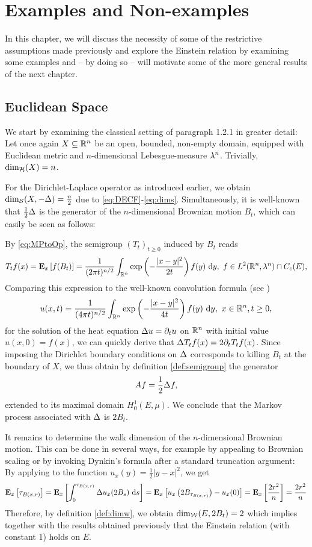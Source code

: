 \chapter{Examples and Non-examples}

In this chapter, we will discuss the necessity of some of the restrictive assumptions made previously and explore the Einstein relation by examining some examples and -- by doing so -- will motivate some of the more general results of the next chapter.

\section{Euclidean Space}

We start by examining the classical setting of paragraph 1.2.1 in greater detail: Let once again $X\ssq\IR^n$ be an open, bounded, non-empty domain, equipped with Euclidean metric and $n$-dimensional Lebesgue-measure $\gl^n$. Trivially, $\dimh(X)=n$. 

For the Dirichlet-Laplace operator as introduced earlier, we obtain 
$\dims(X,-\gD)=\frac{n}{2}$ due to \eqref{eq:DECF}-\eqref{eq:dims}. Simultaneously, it is well-known that $\frac{1}{2}\gD$ is the generator of the $n$-dimensional Brownian motion $B_t$, which can easily be seen as follows:

By \eqref{eq:MPtoOp}, the semigroup $(T_t)_{t\geq0}$ induced by $B_t$ reads
\[
  T_tf(x)
   =\PTEp{f(B_t)}{x}
   =\frac{1}{(2\pi t)^{n/2}}\int_{\IR^n} 
     \exp\left(-\frac{|x-y|^2}{2t}\right)f(y)\,\Di y,
  \ f\in L^2(\IR^n,\gl^n)\cap C_c(E),
\]
Comparing this expression to the well-known convolution formula (see \cite[p.47]{evans2010partial})
\[
  u(x,t)=\frac{1}{(4\pi t)^{n/2}}\int_{\IR^n} \exp\left(-\frac{|x-y|^2}{4t}\right)f(y)\,\Di y,\ x\in\IR^n, t\geq0,
\]
for the solution of the heat equation $\gD u=\partial_t u$ on $\IR^n$ with initial value $u(x,0)=f(x)$, we can quickly derive that $\gD T_tf(x)=2\partial_t T_tf(x)$. Since imposing the Dirichlet boundary conditions on $\gD$ corresponds to killing $B_t$ at the boundary of $X$, we thus obtain by definition \ref{def:semigroup} the generator
\[
  Af=\frac{1}{2}\gD f,
\]
extended to its maximal domain $H_0^1(E,\mu)$. We conclude that the Markov process associated with $\gD$ is $2B_t$.

It remains to determine the walk dimension of the $n$-dimensional Brownian motion. This can be done in several ways, for example by appealing to Brownian scaling or by invoking Dynkin's formula after a standard truncation argument: By applying \cite[Lemma 19.21]{kallenberg2002foundations} to the function $u_x(y)=\frac{1}{2}|y-x|^2$, we get
\[
  \PTEp{\tau_{B(x,r)}}{x}
  =\PTEp{\int_0^{\tau_{B(x,r)}}\gD u_x(2B_s)\,\Di s}{x}
  =\PTEp{u_x\left(2B_{\tau_{B(x,r)}}\right)-u_x(0)}{x}
  =\PTEp{\frac{2r^2}{n}}{x}
  =\frac{2r^2}{n}
\]
Therefore, by definition \ref{def:dimw}, we obtain $\dimw(E,2B_t)=2$ which implies together with the results obtained previously that the Einstein relation (with constant 1) holds on $E$. 



